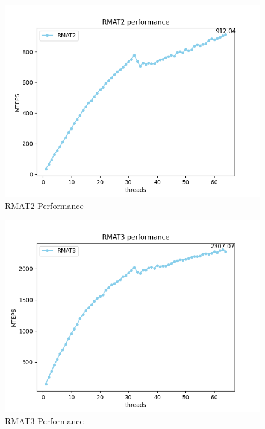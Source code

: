 \documentclass[10pt,twocolumn,letterpaper]{article}
\begin{document}
\begin{figure}[h]
    \centering
    \includegraphics[scale=0.5]{figures/RMAT2.png}
    \caption{RMAT2 Performance}
    \label{fig:RMAT2}
\end{figure}

\begin{figure}[h]
    \centering
    \includegraphics[scale=0.5]{figures/RMAT3.png}
    \caption{RMAT3 Performance}
    \label{fig:RMAT3}
\end{figure}


\newpage
\end{document}
